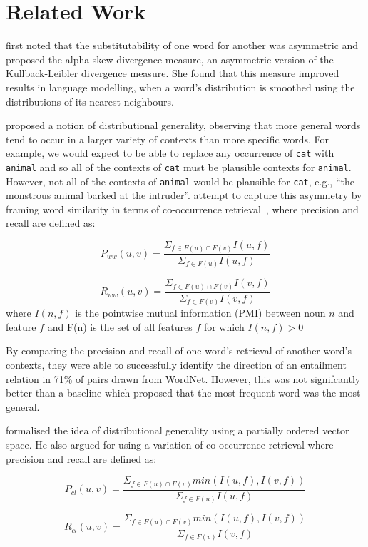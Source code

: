 \documentclass[11pt]{article}
\begin{document}
\section{Related Work}
\label{sect:relwork}

 first noted that the substitutability of one word for another was asymmetric and proposed the alpha-skew divergence measure, an asymmetric version of the Kullback-Leibler divergence measure.  She found that this measure improved results in language modelling, when a word's distribution is smoothed using the distributions of its nearest neighbours.

 proposed a notion of distributional generality, observing that more general words tend to occur in a larger variety of contexts than more specific words.  For example, we would expect to be able to replace any occurrence of \texttt{cat} with \texttt{animal} and so all of the contexts of \texttt{cat} must be plausible contexts for \texttt{animal}.  However, not all of the contexts of \texttt{animal} would be plausible for \texttt{cat}, e.g., ``the monstrous animal barked at the intruder''.   attempt to capture this asymmetry by framing word similarity in terms of co-occurrence retrieval~\cite{Weeds2003}, where precision and recall are defined as:

\[
P_{ww}(u,v) = \frac{\Sigma_{f \in F(u) \cap F(v)} I(u,f)}{\Sigma_{f \in F(u)} I(u,f)}
\]

\[
R_{ww}(u,v) = \frac{\Sigma_{f \in F(u) \cap F(v)} I(v,f)}{\Sigma_{f \in F(v)} I(v,f)}
\]
where $I(n,f)$ is the  pointwise mutual information (PMI) between noun $n$ and feature $f$ and F(n) is the set of all features $f$ for which $I(n,f)>0$

By comparing the precision and recall of one word's retrieval of another word's contexts, they were able to successfully identify the direction of an entailment relation in 71\% of pairs drawn from WordNet.  However, this was not signifcantly better than a baseline which proposed that the most frequent word was the most general.

 formalised the idea of distributional generality using a partially ordered vector space.  He also argued for using a variation of co-occurrence retrieval where precision and recall are defined as:

\[
P_{cl}(u,v) = \frac{\Sigma_{f \in F(u) \cap F(v)} min(I(u,f),I(v,f))}{\Sigma_{f \in F(u)} I(u,f)}
\]

\[
R_{cl}(u,v) = \frac{\Sigma_{f \in F(u) \cap F(v)} min(I(u,f),I(v,f))}{\Sigma_{f \in F(v)} I(v,f)}
\]
\end{document}
